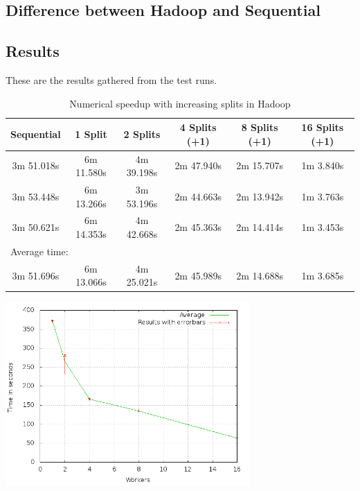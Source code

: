\documentclass[a4paper]{article}
\begin{document}
  \subsection{Difference between Hadoop and Sequential}
  
  \subsection{Results}
    These are the results gathered from the test runs.
    \begin{table}[H]
	    \label{table:hadoop}
	    \caption{Numerical speedup with increasing splits in Hadoop}
	    \begin{center}
		    \begin{tabular}{| c | c | c | c | c | c |}
			    \hline
			    Sequential & 1 Split & 2 Splits & 4 Splits (+1) & 8 Splits (+1) & 16 Splits (+1)\\ 
			    \hline
			    3m 51.018s & 6m 11.580s & 4m 39.198s & 2m 47.940s & 2m 15.707s & 1m 3.840s\\
			    \hline
			    3m 53.448s & 6m 13.266s & 3m 53.196s & 2m 44.663s & 2m 13.942s & 1m 3.763s\\
			    \hline
			    3m 50.621s & 6m 14.353s & 4m 42.668s & 2m 45.363s & 2m 14.414s & 1m 3.453s\\
			    \hline
			    \multicolumn{6}{|l|}{Average time:}\\
			    \hline
			    3m 51.696s & 6m 13.066s & 4m 25.021s & 2m 45.989s & 2m 14.688s & 1m 3.685s\\
			    \hline
		    \end{tabular}
	    \end{center}
    \end{table}
    \begin{center}
      \includegraphics[width=0.7\textwidth]{speedplot.png}
    \end{center}
\end{document}
